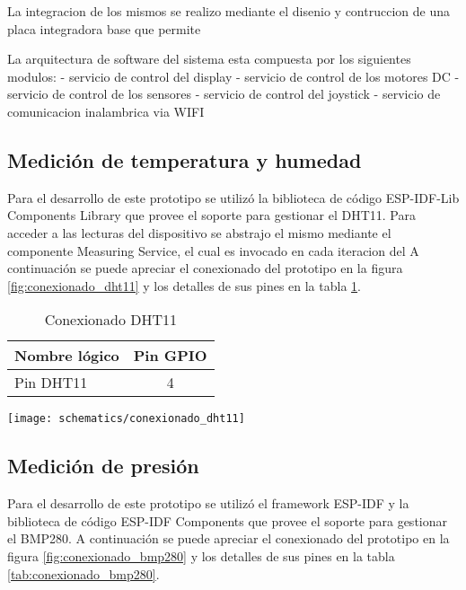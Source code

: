 La integracion de los mismos se realizo mediante el disenio y contruccion de una placa integradora base que permite


La arquitectura de software del sistema esta compuesta por los siguientes modulos:
- servicio de control del display
- servicio de control de los motores DC
- servicio de control de los sensores
- servicio de control del joystick
- servicio de comunicacion inalambrica via WIFI



\subsection{Medición de temperatura y humedad}

Para el desarrollo de este prototipo se utilizó la biblioteca de código ESP-IDF-Lib Components Library \cite{esp_idf_lib_website} que provee el soporte para gestionar el DHT11. Para acceder a las lecturas del dispositivo se abstrajo el mismo mediante el componente Measuring Service, el cual es invocado en cada iteracion del 
A continuación se puede apreciar el conexionado del prototipo en la figura \ref{fig:conexionado_dht11} y los detalles de sus pines en la tabla \ref{tab:conexionado_dht11}.

\vspace{0.5cm}
\begin{table}[h]
\centering
\caption[Conexionado DHT11]{Conexionado DHT11}
\begin{tabular}{l c }
\toprule
\textbf{Nombre lógico} &  \textbf{Pin GPIO}\\
\midrule
 Pin DHT11  & 4  \\
\bottomrule
\hline
\end{tabular}
\label{tab:conexionado_dht11} 
\end{table}
 
\vspace{0.5cm}   
\begin{center}
  \texttt{[image: schematics/conexionado\_dht11]}
    \label{fig:conexionado_dht11}
\end{center}



\subsection{Medición de presión}
Para el desarrollo de este prototipo se utilizó el framework ESP-IDF y la biblioteca de código ESP-IDF Components que provee el soporte para gestionar el BMP280. A continuación se puede apreciar el conexionado del prototipo en la figura \ref{fig:conexionado_bmp280} y los detalles de sus pines en la tabla \ref{tab:conexionado_bmp280}.

